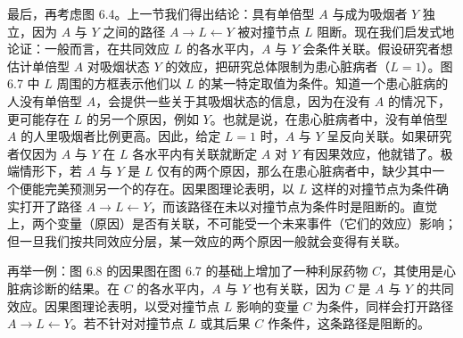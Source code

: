 \begin{figure}[htbp]
\centering
{}
\caption{}
\label{fig:6.6}
\end{figure}


最后，再考虑图 6.4。上一节我们得出结论：具有单倍型 $A$ 与成为吸烟者 $Y$ 独立，因为 $A$ 与 $Y$ 之间的路径 $A\to L\leftarrow Y$ 被对撞节点 $L$ 阻断。现在我们启发式地论证：一般而言，在共同效应 $L$ 的各水平内，$A$ 与 $Y$ 会条件关联。假设研究者想估计单倍型 $A$ 对吸烟状态 $Y$ 的效应，把研究总体限制为患心脏病者（$L=1$）。图 6.7 中 $L$ 周围的方框表示他们以 $L$ 的某一特定取值为条件。知道一个患心脏病的人没有单倍型 $A$，会提供一些关于其吸烟状态的信息，因为在没有 $A$ 的情况下，更可能存在 $L$ 的另一个原因，例如 $Y$。也就是说，在患心脏病者中，没有单倍型 $A$ 的人里吸烟者比例更高。因此，给定 $L=1$ 时，$A$ 与 $Y$ 呈反向关联。如果研究者仅因为 $A$ 与 $Y$ 在 $L$ 各水平内有关联就断定 $A$ 对 $Y$ 有因果效应，他就错了。极端情形下，若 $A$ 与 $Y$ 是 $L$ 仅有的两个原因，那么在患心脏病者中，缺少其中一个便能完美预测另一个的存在。因果图理论表明，以 $L$ 这样的对撞节点为条件确实打开了路径 $A\to L\leftarrow Y$，而该路径在未以对撞节点为条件时是阻断的。直觉上，两个变量（原因）是否有关联，不可能受一个未来事件（它们的效应）影响；但一旦我们按共同效应分层，某一效应的两个原因一般就会变得有关联。

\begin{figure}[htbp]
\centering
{}
\caption{}
\label{fig:6.7}
\end{figure}

再举一例：图 6.8 的因果图在图 6.7 的基础上增加了一种利尿药物 $C$，其使用是心脏病诊断的结果。在 $C$ 的各水平内，$A$ 与 $Y$ 也有关联，因为 $C$ 是 $A$ 与 $Y$ 的共同效应。因果图理论表明，以受对撞节点 $L$ 影响的变量 $C$ 为条件，同样会打开路径 $A\to L\leftarrow Y$。若不针对对撞节点 $L$ 或其后果 $C$ 作条件，这条路径是阻断的。

